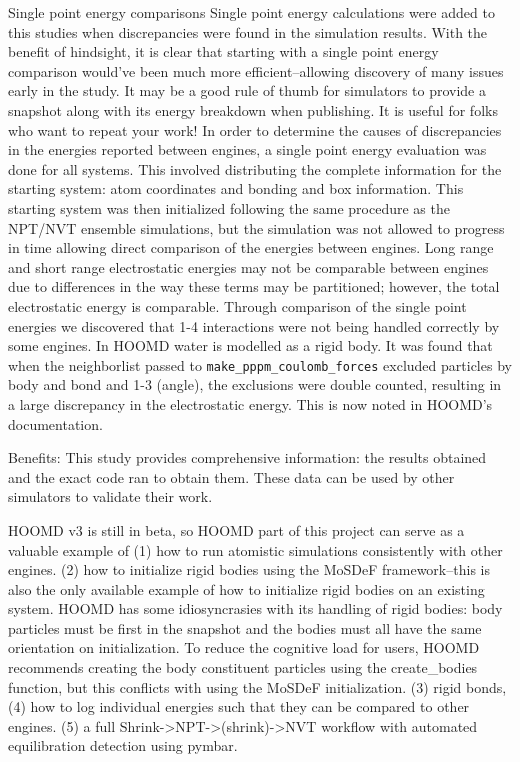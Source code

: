 Single point energy comparisons
Single point energy calculations were added to this studies when discrepancies were found in the simulation results. With the benefit of hindsight, it is clear that starting with a single point energy comparison would've been much more efficient--allowing discovery of many issues early in the study. It may be a good rule of thumb for simulators to provide a snapshot along with its energy breakdown when publishing. It is useful for folks who want to repeat your work!
In order to determine the causes of discrepancies in the energies reported between engines, a single point energy evaluation was done for all systems. This involved distributing the complete information for the starting system: atom coordinates and bonding and box information. This starting system was then initialized following the same procedure as the NPT/NVT ensemble simulations, but the simulation was not allowed to progress in time allowing direct comparison of the energies between engines.
Long range and short range electrostatic energies may not be comparable between engines due to differences in the way these terms may be partitioned; however, the total electrostatic energy is comparable.
Through comparison of the single point energies we discovered that 1-4 interactions were not being handled correctly by some engines.
In HOOMD water is modelled as a rigid body. It was found that when the neighborlist passed to \lstinline{make_pppm_coulomb_forces} excluded particles by body and bond and 1-3 (angle), the exclusions were double counted, resulting in a large discrepancy in the electrostatic energy. This is now noted in HOOMD's documentation.

Benefits:
This study provides comprehensive information: the results obtained and the exact code ran to obtain them. These data can be used by other simulators to validate their work.

HOOMD v3 is still in beta, so HOOMD part of this project can serve as a valuable example of (1) how to run atomistic simulations consistently with other engines. (2) how to initialize rigid bodies using the MoSDeF framework--this is also the only available example of how to initialize rigid bodies on an existing system. HOOMD has some idiosyncrasies with its handling of rigid bodies: body particles must be first in the snapshot and the bodies must all have the same orientation on initialization. To reduce the cognitive load for users, HOOMD recommends creating the body constituent particles using the create\_bodies function, but this conflicts with using the MoSDeF initialization. (3) rigid bonds, (4) how to log individual energies such that they can be compared to other engines. (5) a full Shrink->NPT->(shrink)->NVT workflow with automated equilibration detection using pymbar.

